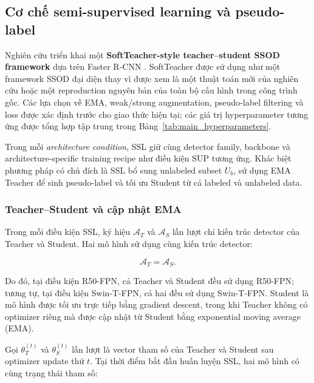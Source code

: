 \documentclass[pdflatex,sn-mathphys-num]{sn-jnl}%
\theoremstyle{thmstyleone}%
\theoremstyle{thmstyletwo}%
\theoremstyle{thmstylethree}%
\begin{document}
\endgroup

\subsection{Cơ chế semi-supervised learning và pseudo-label}
\label{subsec:ssl_pseudolabel_mechanism}
\label{subsec:Semi_supervised_Object_Detection_Framework}

Nghiên cứu triển khai một \textbf{SoftTeacher-style teacher--student SSOD
framework} dựa trên Faster R-CNN \cite{xu2021end}. SoftTeacher được sử dụng
như một framework SSOD đại diện thay vì được xem là một thuật toán mới của
nghiên cứu hoặc một reproduction nguyên bản của toàn bộ cấu hình trong công
trình gốc. Các lựa chọn về EMA, weak/strong augmentation, pseudo-label
filtering và loss được xác định trước cho giao thức hiện tại; các giá trị
hyperparameter tương ứng được tổng hợp tập trung trong
Bảng~\ref{tab:main_hyperparameters}.

Trong mỗi \textit{architecture condition}, SSL giữ cùng detector family,
backbone và architecture-specific training recipe như điều kiện SUP tương
ứng. Khác biệt phương pháp có chủ đích là SSL bổ sung unlabeled subset
\(U_b\), sử dụng EMA Teacher để sinh pseudo-label và tối ưu Student từ cả
labeled và unlabeled data.

\subsubsection{Teacher--Student và cập nhật EMA}
\label{subsubsec:teacher_student_formulation}
\label{subsubsec:teacher_ema_update}

Trong mỗi điều kiện SSL, ký hiệu
\(\mathcal{A}_{T}\) và \(\mathcal{A}_{S}\) lần lượt chỉ kiến trúc detector
của Teacher và Student. Hai mô hình sử dụng cùng kiến trúc detector:

\begin{equation}
\mathcal{A}_{T}
=
\mathcal{A}_{S}.
\label{eq:teacher_student_same_architecture}
\end{equation}

Do đó, tại điều kiện R50-FPN, cả Teacher và Student đều sử dụng R50-FPN;
tương tự, tại điều kiện Swin-T-FPN, cả hai đều sử dụng Swin-T-FPN. Student
là mô hình được tối ưu trực tiếp bằng gradient descent, trong khi Teacher
không có optimizer riêng mà được cập nhật từ Student bằng exponential moving
average (EMA).

Gọi \(\theta_T^{(t)}\) và \(\theta_S^{(t)}\) lần lượt là vector tham số
của Teacher và Student sau optimizer update thứ \(t\).
Tại thời điểm bắt đầu huấn luyện SSL, hai mô hình có cùng trạng thái tham số:
\end{document}

